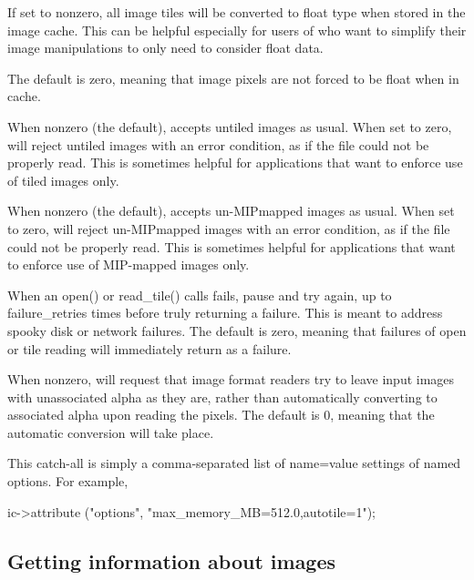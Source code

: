 If set to nonzero, all image tiles will be converted to {\cf float} 
type when stored in the image cache.  This can be helpful especially
for users of \ImageBuf who want to simplify their image manipulations
to only need to consider {\cf float} data.

The default is zero, meaning that image pixels are not forced to
be {\cf float} when in cache.
\apiend

When nonzero (the default), \ImageCache accepts untiled images as
usual.  When set to zero, \ImageCache will reject untiled images with
an error condition, as if the file could not be properly read.
This is sometimes helpful for applications that want to enforce use of
tiled images only.
\apiend

When nonzero (the default), \ImageCache accepts un-MIPmapped images as
usual.  When set to zero, \ImageCache will reject un-MIPmapped images with
an error condition, as if the file could not be properly read.
This is sometimes helpful for applications that want to enforce use of
MIP-mapped images only.
\apiend

When an {\cf open()} or {\cf read_tile()} calls fails, pause and try
again, up to {\cf failure_retries} times before truly returning a
failure.  This is meant to address spooky disk or network failures.  The
default is zero, meaning that failures of open or tile reading will
immediately return as a failure.
\apiend

When nonzero, will request that image format readers try to leave input
images with unassociated alpha as they are, rather than automatically
converting to associated alpha upon reading the pixels.  The default is
0, meaning that the automatic conversion will take place.
\apiend

This catch-all is simply a comma-separated list of {\cf name=value}
settings of named options.  For example,
\begin{code}
        ic->attribute ("options", "max_memory_MB=512.0,autotile=1");
\end{code}
\apiend

\bigskip

\subsection{Getting information about images}
\label{sec:imagecache:api:getimageinfo}
\label{sec:imagecache:api:getimagespec}

